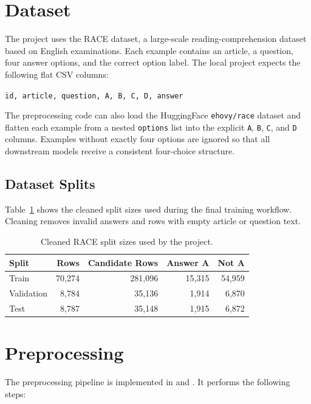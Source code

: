 \documentclass[12pt,a4paper]{article}
\begin{document}
\section{Dataset}

The project uses the RACE dataset, a large-scale reading-comprehension dataset
based on English examinations. Each example contains an article, a question,
four answer options, and the correct option label. The local project expects the
following flat CSV columns:

\begin{center}
\texttt{id, article, question, A, B, C, D, answer}
\end{center}

The preprocessing code can also load the HuggingFace \texttt{ehovy/race}
dataset and flatten each example from a nested \texttt{options} list into the
explicit \texttt{A}, \texttt{B}, \texttt{C}, and \texttt{D} columns. Examples
without exactly four options are ignored so that all downstream models receive a
consistent four-choice structure.

\subsection{Dataset Splits}

Table~\ref{tab:splits} shows the cleaned split sizes used during the final
training workflow. Cleaning removes invalid answers and rows with empty article
or question text.

\begin{table}[H]
\centering
\caption{Cleaned RACE split sizes used by the project.}
\label{tab:splits}
\begin{tabular}{lrrrr}
\toprule
\textbf{Split} & \textbf{Rows} & \textbf{Candidate Rows} & \textbf{Answer A} & \textbf{Not A} \\
\midrule
Train & 70,274 & 281,096 & 15,315 & 54,959 \\
Validation & 8,784 & 35,136 & 1,914 & 6,870 \\
Test & 8,787 & 35,148 & 1,915 & 6,872 \\
\bottomrule
\end{tabular}
\end{table}

\section{Preprocessing}

The preprocessing pipeline is implemented in 
and . It performs the following steps:
\end{document}
